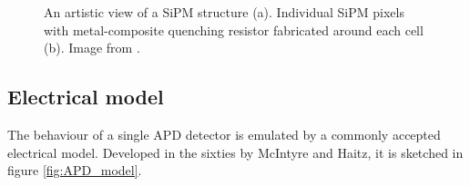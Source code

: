 \begin{figure}
	\centering
	 \quad
	\caption{An artistic view of a SiPM structure (a). Individual  SiPM  pixels  with  metal-composite  quenching  resistor  fabricated around each cell (b). Image from \cite{SiPM_img_APD}.}
	\label{fig:SiPM_APD}
\end{figure}

\subsection*{Electrical model}
The behaviour of a single APD detector is emulated by a commonly accepted electrical model. Developed in the sixties by McIntyre and Haitz, it is sketched in figure \ref{fig:APD_model}.\\

